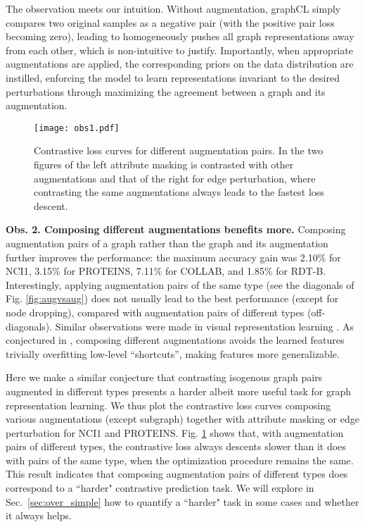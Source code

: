 The observation meets our intuition. Without augmentation,
graphCL simply compares two original samples as a negative pair (with the positive pair loss becoming zero), leading to homogeneously pushes all graph representations away from each other,
which is non-intuitive to justify.
Importantly, when appropriate augmentations are applied, the corresponding priors on the data distribution are instilled, enforcing the model to learn representations invariant to the desired perturbations through maximizing the agreement between a graph and its augmentation.  

\begin{figure}[!htb] 
    \centering 
    \texttt{[image: obs1.pdf]}
    \caption{\small{Contrastive loss curves for different augmentation pairs.
    In the two figures of the left attribute masking is contrasted with other augmentations and that of the right for edge perturbation, where contrasting the same augmentations always leads to the fastest loss descent.}}
    \vspace{-1em}
    \label{fig:cl_loss} 
\end{figure}

\textbf{Obs. 2. Composing different augmentations benefits more.} 
Composing augmentation pairs of a graph rather than the graph and its augmentation further improves the performance: the maximum accuracy gain was 2.10\% for NCI1, 3.15\% for PROTEINS, 7.11\% for COLLAB, and 1.85\% for RDT-B.  Interestingly, applying augmentation pairs of the same type  (see the diagonals of Fig. \ref{fig:augvsaug}) does not usually lead to the best performance (except for node dropping),  
compared with augmentation pairs of different types (off-diagonals).  
Similar observations were made in visual representation learning  \cite{chen2020simple}. %
As conjectured in \cite{chen2020simple}, composing different augmentations avoids the learned features trivially overfitting low-level ``shortcuts'', making features more generalizable.

Here we make a similar conjecture that contrasting isogenous graph pairs augmented in different types presents a harder albeit more useful task for graph representation learning.
We thus plot the contrastive loss curves composing various augmentations (except subgraph) together with attribute masking or edge perturbation  for NCI1 and PROTEINS. Fig. \ref{fig:cl_loss} 
shows that, with augmentation pairs of different types, the contrastive loss always descents slower than it does with pairs of the same type, when the optimization procedure remains the same. This result indicates that composing augmentation pairs of different types does correspond to a ``harder" contrastive prediction task.
We will explore in Sec.~\ref{sec:over_simple} how to quantify a ``harder" task in some cases and whether it always helps. %

